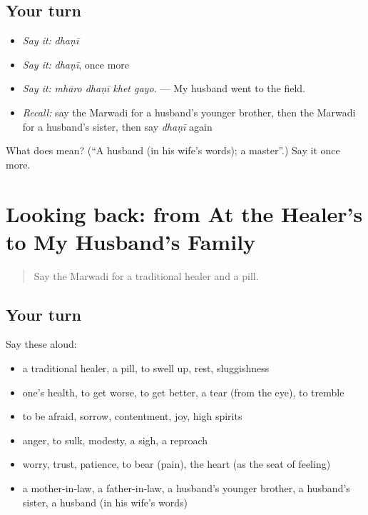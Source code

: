 \subsection*{Your turn}
\begin{itemize}
\raggedright
  \item \emph{Say it:} \emph{dhaṇī}
  \item \emph{Say it:} \emph{dhaṇī}, once more
  \item \emph{Say it:} \emph{mhāro dhaṇī khet gayo.} — My husband went to the field.
  \item \emph{Recall:} say the Marwadi for a husband's younger brother, then the Marwadi for a husband's sister, then say \emph{dhaṇī} again
\end{itemize}

\begin{tcolorbox}[breakable,colback=teal!4,colframe=teal!35!black,title={Before you move on}]
What does  mean? (\textquotedblleft{}A husband (in his wife's words); a master\textquotedblright{}.) Say it once more.
\end{tcolorbox}
\section[(dialogue)]{Looking back: from At the Healer's to My Husband's Family}

\label{lesson:MW-R259-review-254-259}



\begin{quote}
Say the Marwadi for a traditional healer and a pill.
\end{quote}

\subsection*{Your turn}
Say these aloud:

\begin{itemize}
\raggedright
  \item a traditional healer, a pill, to swell up, rest, sluggishness
  \item one's health, to get worse, to get better, a tear (from the eye), to tremble
  \item to be afraid, sorrow, contentment, joy, high spirits
  \item anger, to sulk, modesty, a sigh, a reproach
  \item worry, trust, patience, to bear (pain), the heart (as the seat of feeling)
  \item a mother-in-law, a father-in-law, a husband's younger brother, a husband's sister, a husband (in his wife's words)
\end{itemize}

